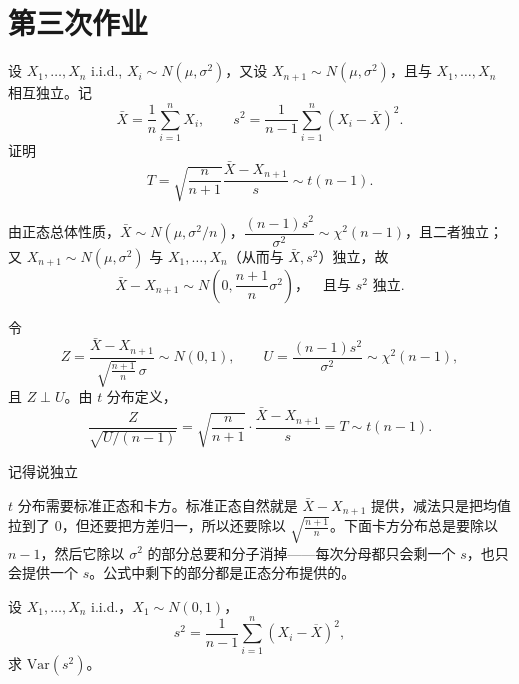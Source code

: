 \section{第三次作业}
\begin{homework}
设 \(X_1,\dots,X_n\) i.i.d., \(X_i\sim N(\mu,\sigma^2)\)，又设 \(X_{n+1}\sim N(\mu,\sigma^2)\)，且与 \(X_1,\dots,X_n\) 相互独立。记
\[
\bar X=\frac1n\sum_{i=1}^n X_i,\qquad
s^2=\frac1{n-1}\sum_{i=1}^n (X_i-\bar X)^2.
\]
证明
\[
T=\sqrt{\frac{n}{n+1}}\frac{\bar X-X_{n+1}}{s}\sim t(n-1).
\]
\end{homework}
\begin{solution}
由正态总体性质，$\bar X\sim N(\mu,\sigma^2/n)$，$\dfrac{(n-1)s^2}{\sigma^2}\sim\chi^2(n-1)$，且二者独立；又 $X_{n+1}\sim N(\mu,\sigma^2)$ 与 $X_1,\dots,X_n$（从而与 $\bar X,s^2$）独立，故
\[
\bar X-X_{n+1}\sim N\!\left(0,\frac{n+1}{n}\sigma^2\right)，\quad \text{且与 } s^2 \text{ 独立}.
\]

令
\[
Z=\frac{\bar X-X_{n+1}}{\sqrt{\frac{n+1}{n}}\,\sigma}\sim N(0,1),\qquad
U=\frac{(n-1)s^2}{\sigma^2}\sim\chi^2(n-1),
\]
且 $Z\perp U$。由 $t$ 分布定义，
\[
\frac{Z}{\sqrt{U/(n-1)}}
=\sqrt{\frac{n}{n+1}}\cdot\frac{\bar X-X_{n+1}}{s}
=T\sim t(n-1).
\]
\end{solution}
\begin{dxtips}
    记得说独立
\end{dxtips}
\begin{dxtips}
$t$ 分布需要标准正态和卡方。标准正态自然就是 $\bar X-X_{n+1}$ 提供，减法只是把均值拉到了 $0$，但还要把方差归一，所以还要除以 $\sqrt{\frac{n+1}{n}}$。下面卡方分布总是要除以 $n-1$，然后它除以 $\sigma^2$ 的部分总要和分子消掉——每次分母都只会剩一个 $s$，也只会提供一个 $s$。公式中剩下的部分都是正态分布提供的。
\end{dxtips}
\begin{homework}[2.4第1题]
设 \(X_1,\ldots,X_n\) i.i.d.，\(X_1\sim N(0,1)\)，
\[
s^2=\frac{1}{n-1}\sum_{i=1}^n (X_i-\overline{X})^2,
\]
求 \(\mathrm{Var}(s^2)\)。
\end{homework}

